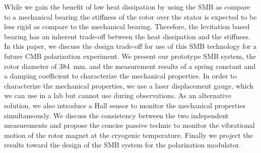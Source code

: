 \documentclass[a4paper,11pt]{jpconf}
\newcommand{\cred}[1]{{\color{red}#1}}
\begin{document}
While we gain the benefit of low heat dissipation by using the SMB as compare to a mechanical bearing
the stiffness of the rotor over the stator is expected to be less rigid as compare to the mechanical bearing.
Therefore, the levitation based bearing has an inherent trade-off between the heat dissipation and the stiffness.
In this paper, we discuss the design trade-off for use of this SMB technology for a future CMB polarization experiment.
We present our prototype SMB system, the rotor diameter of 384~mm, and the measurement results of a spring constant and a damping coefficient to characterize the mechanical properties.
In order to characterize the mechanical properties, we use a laser displacement gauge, which we can use in a lab but cannot use during observations.
As an alternative solution, we also introduce a Hall sensor to monitor the mechanical properties simultaneously.
We discuss the consistency between the two independent measurements and propose the concise passive technic to monitor the vibrational motion of the rotor magnet at the cryogenic temperature.
Finally we project the results toward the design of the SMB system for the polarization modulator.

\end{document}
